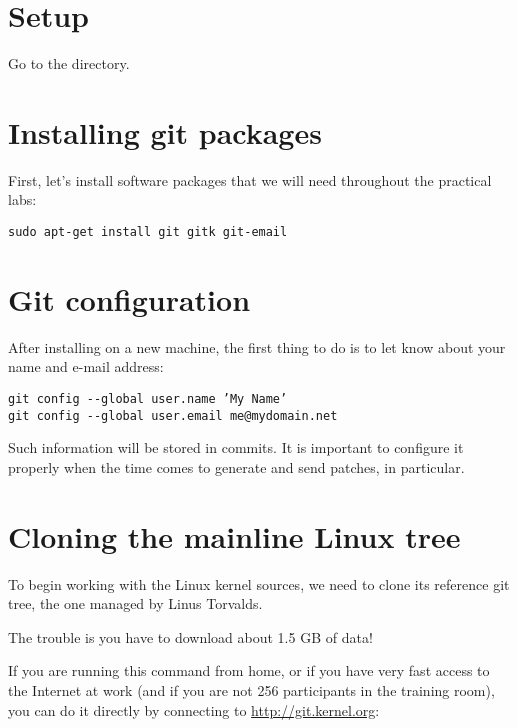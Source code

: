 
\section{Setup}

Go to the  directory.

\section{Installing git packages}

First, let's install software packages that we will need
throughout the practical labs:

\begin{verbatim}
sudo apt-get install git gitk git-email
\end{verbatim}

\section{Git configuration}

After installing  on a new machine, the first thing to do is
to let  know about your name and e-mail address:

\begin{verbatim}
git config --global user.name ’My Name’
git config --global user.email me@mydomain.net
\end{verbatim}

Such information will be stored in commits. It is important
to configure it properly when the time comes to generate and 
send patches, in particular.

\section{Cloning the mainline Linux tree}

To begin working with the Linux kernel sources, we need to clone its
reference git tree, the one managed by Linus Torvalds.

The trouble is you have to download about 1.5 GB of data!

If you are running this command from home, or if you have very fast
access to the Internet at work (and if you are not 256 participants in the
training room), you can do it directly by connecting to
\url{http://git.kernel.org}:

